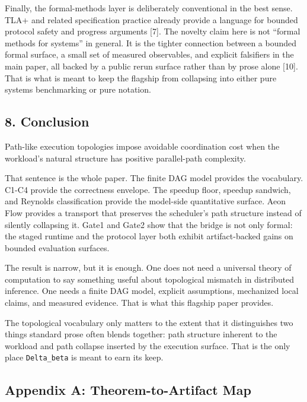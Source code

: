 \documentclass[
  11pt,
]{article}
\begin{document}
Finally, the formal-methods layer is deliberately conventional in the
best sense. TLA+ and related specification practice already provide a
language for bounded protocol safety and progress arguments {[}7{]}. The
novelty claim here is not ``formal methods for systems'' in general. It
is the tighter connection between a bounded formal surface, a small set
of measured observables, and explicit falsifiers in the main paper, all
backed by a public rerun surface rather than by prose alone {[}10{]}.
That is what is meant to keep the flagship from collapsing into either
pure systems benchmarking or pure notation.

\subsection{8. Conclusion}\label{conclusion}

Path-like execution topologies impose avoidable coordination cost when
the workload's natural structure has positive parallel-path complexity.

That sentence is the whole paper. The finite DAG model provides the
vocabulary. C1-C4 provide the correctness envelope. The speedup floor,
speedup sandwich, and Reynolds classification provide the model-side
quantitative surface. Aeon Flow provides a transport that preserves the
scheduler's path structure instead of silently collapsing it. Gate1 and
Gate2 show that the bridge is not only formal: the staged runtime and
the protocol layer both exhibit artifact-backed gains on bounded
evaluation surfaces.

The result is narrow, but it is enough. One does not need a universal
theory of computation to say something useful about topological mismatch
in distributed inference. One needs a finite DAG model, explicit
assumptions, mechanized local claims, and measured evidence. That is
what this flagship paper provides.

The topological vocabulary only matters to the extent that it
distinguishes two things standard prose often blends together: path
structure inherent to the workload and path collapse inserted by the
execution surface. That is the only place \texttt{Delta\_beta} is meant
to earn its keep.

\subsection{Appendix A: Theorem-to-Artifact
Map}\label{appendix-a-theorem-to-artifact-map}
\end{document}
